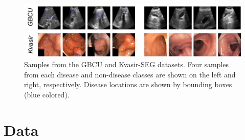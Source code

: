 

%
%
\begin{figure}[t]
    \centering
    \includegraphics[width=\textwidth]{figs/wsod/data_sample.png}
    \caption[Visuals of GBC and Polyp data samples]{Samples from the GBCU \cite{basu2022surpassing} and Kvasir-SEG \cite{kvasir} datasets. Four samples from each disease and non-disease classes are shown on the left and right, respectively. Disease locations are shown by bounding boxes (blue colored).}
    \label{wsod_fig:data_sample}
\end{figure}

\section{Data}

